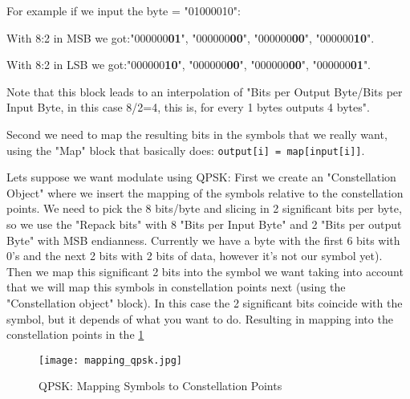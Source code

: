 \documentclass[a4paper, 10pt, conference]{ieeeconf}      %
\begin{document}
    For example if we input the byte = "01000010":
    
    With 8:2 in MSB we got:"000000\textbf{01}", "000000\textbf{00}", "000000\textbf{00}", "000000\textbf{10}".
    
    With 8:2 in LSB we got:"000000\textbf{10}", "000000\textbf{00}", "000000\textbf{00}", "000000\textbf{01}".
    
    Note that this block leads to an interpolation of "Bits per Output Byte/Bits per Input Byte, in this case 8/2=4, this is, for every 1 bytes outputs 4 bytes". 
        
        Second we need to map the resulting bits in the symbols that we really want, using the "Map" block that basically does: \verb|output[i] = map[input[i]]|.
    
    Lets suppose we want modulate using QPSK: 
        First we create an "Constellation Object" where we insert the mapping of the symbols relative to the constellation points. 
        We need to pick the 8 bits/byte and slicing in 2 significant bits per byte, so we use the "Repack bits" with 8 "Bits per Input Byte" and 2 "Bits per output Byte" with MSB endianness. Currently we have a byte with the first 6 bits with 0's and the next 2 bits with 2 bits of data, however it's not our symbol yet).
        Then we map this significant 2 bits into the symbol we want taking into account that we will map this symbols in constellation points next (using the "Constellation object" block). In this case the 2 significant bits coincide with the symbol, but it depends of what you want to do.
        Resulting in mapping into the constellation points in the \ref{fig:mapping_qpsk}
        \begin{figure}
            \centering
            \texttt{[image: mapping\_qpsk.jpg]}
            \caption{QPSK: Mapping Symbols to Constellation Points}
            \label{fig:mapping_qpsk}
        \end{figure}
        
\end{document}
